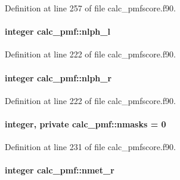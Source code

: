 Definition at line 257 of file calc\-\_\-pmfscore.\-f90.

\hypertarget{classcalc__pmf_a4b04a9f317d4dcb45e3d51751fbac115}{
\paragraph[{nlph\-\_\-l}]{\setlength{\rightskip}{0pt plus 5cm}integer calc\-\_\-pmf\-::nlph\-\_\-l}}\label{classcalc__pmf_a4b04a9f317d4dcb45e3d51751fbac115}


Definition at line 222 of file calc\-\_\-pmfscore.\-f90.

\hypertarget{classcalc__pmf_a10154c74668f9e5a53a5dad472608a62}{
\paragraph[{nlph\-\_\-r}]{\setlength{\rightskip}{0pt plus 5cm}integer calc\-\_\-pmf\-::nlph\-\_\-r}}\label{classcalc__pmf_a10154c74668f9e5a53a5dad472608a62}


Definition at line 222 of file calc\-\_\-pmfscore.\-f90.

\hypertarget{classcalc__pmf_aa222e2cc7f6c9e5df634fd4c513671af}{
\paragraph[{nmasks}]{\setlength{\rightskip}{0pt plus 5cm}integer, private calc\-\_\-pmf\-::nmasks = 0\hspace{0.3cm}{\ttfamily [private]}}}\label{classcalc__pmf_aa222e2cc7f6c9e5df634fd4c513671af}


Definition at line 231 of file calc\-\_\-pmfscore.\-f90.

\hypertarget{classcalc__pmf_a323b86d254d89f4f5e9f2f9725209b4f}{
\paragraph[{nmet\-\_\-r}]{\setlength{\rightskip}{0pt plus 5cm}integer calc\-\_\-pmf\-::nmet\-\_\-r}}\label{classcalc__pmf_a323b86d254d89f4f5e9f2f9725209b4f}


